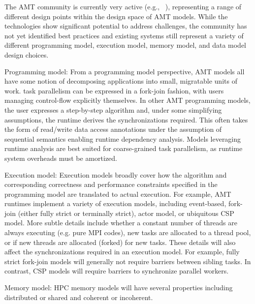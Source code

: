The \gls{AMT} community is currently very active (e.g.,
~\cite{OCR,STAPL,Legion,Realm,StencilHPX,Charm++,Uintah,Loci,PARSEC,DaGuE,Cilk}),
representing a range of different design points within the
design space of \gls{AMT} models. While the technologies show significant
potential to address challenges, the community has not yet identified best
practices and existing systems still represent a variety of different \gls{programming model},
\gls{execution model}, \gls{memory model}, and \gls{data model} design choices.  

\begin{compactdesc}
\item[Programming model:]
From a \gls{programming model} perspective, \gls{AMT} models all have some notion of decomposing applications into small, \gls{migratable} units of work. 
\Gls{task parallelism} can be expressed in a \gls{fork-join} fashion, with users managing control-flow explicitly themselves. 
  In other \gls{AMT} \glspl{programming model}, the user expresses a step-by-step algorithm and, under some simplifying assumptions, the runtime derives the synchronizations required.
  This often takes the form of read/write data access annotations under the
  assumption of \gls{sequential semantics} enabling runtime dependency analysis.
  Models leveraging runtime analysis are best suited for coarse-grained \gls{task parallelism}, as \gls{runtime system} overheads must be amortized.
\item[Execution model:]
  Execution models broadly cover how the algorithm and corresponding
  correctness and performance constraints specified in the \gls{programming
  model} are translated to actual execution.
  For example, \gls{AMT} runtimes implement a variety of \glspl{execution
  model}, including \gls{event-based}, \gls{fork-join} (either \gls{fully
  strict} or \gls{terminally strict}), \gls{actor model}, or ubiquitous
  \gls{CSP} model.  More subtle details include whether a constant number of
  threads are always executing (e.g. pure MPI codes), new tasks are allocated
  to a thread pool, or if new threads are allocated (forked) for new tasks.
  These details will also affect the synchronizations required in an execution
  model. For example, fully strict \gls{fork-join} models will generally not
  require barriers between sibling tasks. In contrast, \gls{CSP} models will require barriers to synchronize parallel workers.
\item[Memory model:]
  \gls{HPC} \glspl{memory model} will have several properties including distributed or shared and coherent or incoherent. 

\end{compactdesc}
